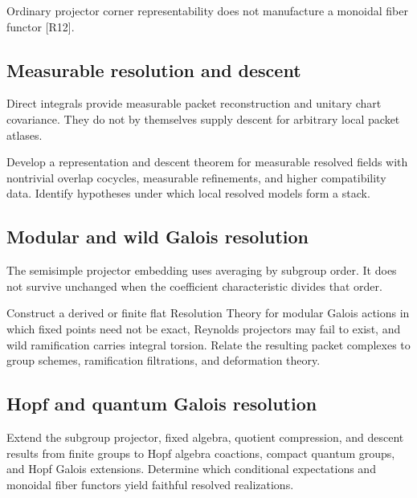 \documentclass{aomart}
\theoremstyle{definition}
\theoremstyle{remark}
\newcommand{\Rcite}[1]{\textup{[#1]}}
\begin{document}
Ordinary projector corner representability does not manufacture a monoidal fiber functor \Rcite{R12}.

\subsection{Measurable resolution and descent}

Direct integrals provide measurable packet reconstruction and unitary chart covariance. They do not by themselves supply descent for arbitrary local packet atlases.

\begin{problem}\label{prob:measurable}
Develop a representation and descent theorem for measurable resolved fields with nontrivial overlap cocycles, measurable refinements, and higher compatibility data. Identify hypotheses under which local resolved models form a stack.
\end{problem}

\subsection{Modular and wild Galois resolution}

The semisimple projector embedding uses averaging by subgroup order. It does not survive unchanged when the coefficient characteristic divides that order.

\begin{problem}\label{prob:modular_galois}
Construct a derived or finite flat Resolution Theory for modular Galois actions in which fixed points need not be exact, Reynolds projectors may fail to exist, and wild ramification carries integral torsion. Relate the resulting packet complexes to group schemes, ramification filtrations, and deformation theory.
\end{problem}

\subsection{Hopf and quantum Galois resolution}

\begin{problem}\label{prob:hopf_galois}
Extend the subgroup projector, fixed algebra, quotient compression, and descent results from finite groups to Hopf algebra coactions, compact quantum groups, and Hopf Galois extensions. Determine which conditional expectations and monoidal fiber functors yield faithful resolved realizations.
\end{problem}
\end{document}
